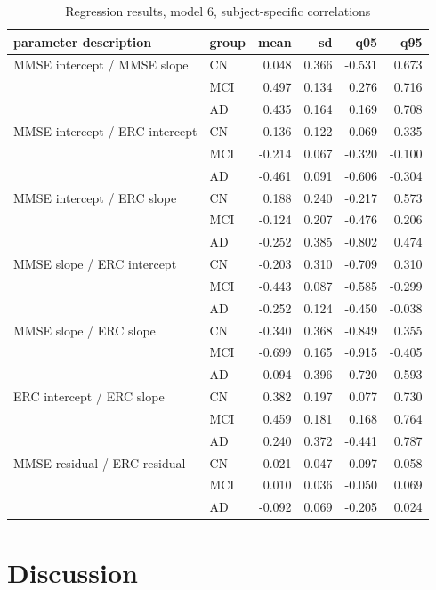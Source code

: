 \documentclass[12pt]{article}
\begin{document}
\pagebreak
\begin{table}[H]
\centering
\caption{Regression results, model 6, subject-specific correlations}
\begin{tabular}{|l|l|r|r|r|r|}
  \hline
  parameter description & group & mean & sd & q05 & q95 \\ 
  \hline
  MMSE intercept / MMSE slope & CN & 0.048 & 0.366 & -0.531 & 0.673 \\ 
   & MCI & 0.497 & 0.134 & 0.276 & 0.716 \\ 
   & AD  & 0.435 & 0.164 & 0.169 & 0.708 \\ 
  MMSE intercept / ERC intercept & CN & 0.136 & 0.122 & -0.069 & 0.335 \\ 
  & MCI & -0.214 & 0.067 & -0.320 & -0.100 \\ 
  & AD & -0.461 & 0.091 & -0.606 & -0.304 \\ 
  MMSE intercept / ERC slope & CN & 0.188 & 0.240 & -0.217 & 0.573 \\ 
  & MCI & -0.124 & 0.207 & -0.476 & 0.206 \\ 
  & AD & -0.252 & 0.385 & -0.802 & 0.474 \\ 
  MMSE slope / ERC intercept & CN & -0.203 & 0.310 & -0.709 & 0.310 \\ 
  & MCI & -0.443 & 0.087 & -0.585 & -0.299 \\ 
  & AD & -0.252 & 0.124 & -0.450 & -0.038 \\ 
  MMSE slope / ERC slope & CN & -0.340 & 0.368 & -0.849 & 0.355 \\ 
  & MCI & -0.699 & 0.165 & -0.915 & -0.405 \\ 
  & AD & -0.094 & 0.396 & -0.720 & 0.593 \\ 
  ERC intercept / ERC slope & CN & 0.382 & 0.197 & 0.077 & 0.730 \\ 
  & MCI & 0.459 & 0.181 & 0.168 & 0.764 \\ 
  & AD & 0.240 & 0.372 & -0.441 & 0.787 \\ 
  MMSE residual / ERC residual & CN & -0.021 & 0.047 & -0.097 & 0.058 \\ 
  & MCI & 0.010 & 0.036 & -0.050 & 0.069 \\ 
  & AD & -0.092 & 0.069 & -0.205 & 0.024 \\ 
   \hline
\end{tabular}
\end{table}

\pagebreak
\section{Discussion}
\end{document}
